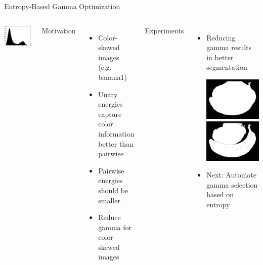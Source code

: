\documentclass[compress,aspectratio=43]{beamer}
\begin{document}
\begin{frame}{Entropy-Based Gamma Optimization}
\begin{columns}[t]
\includegraphics[width=1\linewidth]{figures/gamma/flower/flower-h.eps}
{\scriptsize
Motivation
\begin{itemize}
\item Color-skewed images (e.g. banana1)
\item Unary energies capture color information better than pairwise
\item Pairwise energies should be smaller
\item Reduce gamma for color-skewed images
\end{itemize}

Experiments
\begin{itemize}
\item Reducing gamma results in better segmentation\\
\begin{center}
\includegraphics[width=0.3\linewidth]{figures/gamma/banana1_high_gamma.png}\hspace{5mm}
\includegraphics[width=0.3\linewidth]{figures/gamma/banana1_low_gamma.png}
\end{center}
\item Next: Automate gamma selection based on entropy
\end{itemize}
}
\end{columns}
\end{frame}
\end{document}
